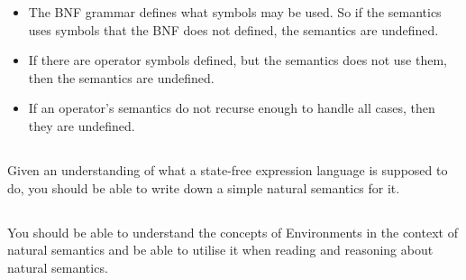 \begin{itemize}[noitemsep]
\item The BNF grammar defines what symbols may be used. So if the semantics uses symbols that the BNF does not defined, the semantics are undefined.
\item If there are operator symbols defined, but the semantics does not use them, then the semantics are undefined.
\item If an operator's semantics do not recurse enough to handle all cases, then they are undefined.
\end{itemize}

\subsection{}
Given an understanding of what a state-free expression language is supposed to do, you should be able to write down a simple natural semantics for it.

\subsection{}
You should be able to understand the concepts of Environments in the context of natural semantics and be able to utilise it when reading and reasoning about natural semantics.

